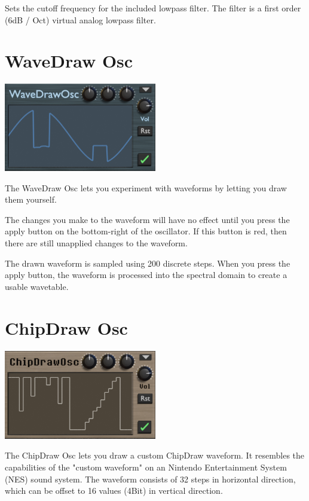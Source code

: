 {Sets the cutoff frequency for the included lowpass filter. The filter is a first order (6dB / Oct) virtual analog lowpass filter.}

\section{WaveDraw Osc}
\label{wavedraw}
\begin{center}
    \includegraphics[width=0.5\textwidth]{graphics/wavedraw_osc.png}
\end{center}
The WaveDraw Osc lets you experiment with waveforms by letting you draw them yourself.

\begin{tcolorbox}[colback=yellow!10!white,
        colframe=white!20!black,
        center,
        valign=top,
        halign=left,
        center title,
        width=\textwidth]

    The changes you make to the waveform will have no effect until you press the apply button on the bottom-right of the oscillator. If this button is red, then there are still unapplied changes to the waveform.
\end{tcolorbox}

The drawn waveform is sampled using 200 discrete steps. When you press the apply button, the waveform is processed into the spectral domain to create a usable wavetable.

\section{ChipDraw Osc}
\label{chipdraw}
\begin{center}
    \includegraphics[width=0.5\textwidth]{graphics/chipdraw_osc.png}
\end{center}
The ChipDraw Osc lets you draw a custom ChipDraw waveform. It resembles the capabilities of the "custom waveform" on an Nintendo Entertainment System (NES) sound system. The waveform consists of 32 steps in horizontal direction, which can be offset to 16 values (4Bit) in vertical direction.

